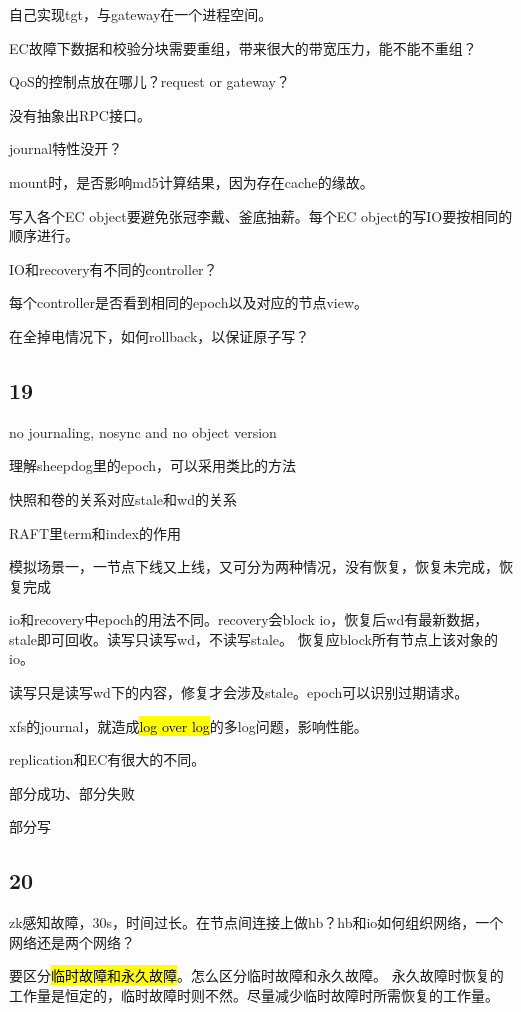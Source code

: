 自己实现tgt，与gateway在一个进程空间。

EC故障下数据和校验分块需要重组，带来很大的带宽压力，能不能不重组？

QoS的控制点放在哪儿？request or gateway？

没有抽象出RPC接口。

journal特性没开？

mount时，是否影响md5计算结果，因为存在cache的缘故。

写入各个EC object要避免张冠李戴、釜底抽薪。每个EC object的写IO要按相同的顺序进行。

IO和recovery有不同的controller？

每个controller是否看到相同的epoch以及对应的节点view。

在全掉电情况下，如何rollback，以保证原子写？

\subsection{19}

no journaling, nosync and no object version

理解sheepdog里的epoch，可以采用类比的方法
\begin{enumbox}
\item 快照和卷的关系对应stale和wd的关系
\item RAFT里term和index的作用
\end{enumbox}

模拟场景一，一节点下线又上线，又可分为两种情况，没有恢复，恢复未完成，恢复完成

io和recovery中epoch的用法不同。recovery会block io，恢复后wd有最新数据，stale即可回收。读写只读写wd，不读写stale。
恢复应block所有节点上该对象的io。

读写只是读写wd下的内容，修复才会涉及stale。epoch可以识别过期请求。

xfs的journal，就造成\hl{log over log}的多log问题，影响性能。

replication和EC有很大的不同。

部分成功、部分失败

部分写

\subsection{20}

zk感知故障，30s，时间过长。在节点间连接上做hb？hb和io如何组织网络，一个网络还是两个网络？

要区分\hl{临时故障和永久故障}。怎么区分临时故障和永久故障。
永久故障时恢复的工作量是恒定的，临时故障时则不然。尽量减少临时故障时所需恢复的工作量。

